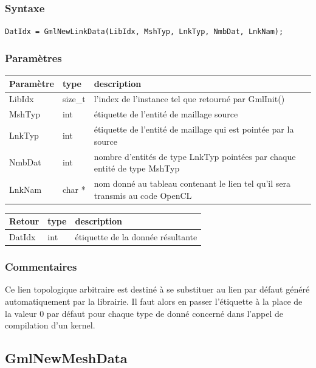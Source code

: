 \documentclass[a4paper,12pt]{article}
\begin{document}
\subsubsection*{Syntaxe}

{\tt DatIdx = GmlNewLinkData(LibIdx, MshTyp, LnkTyp, NmbDat, LnkNam);}

\subsubsection*{Paramètres}

\begin{tabular}{|m{2cm}|m{1.5cm}|m{10.5cm}|}
\hline
Paramètre  & type    & description \\
\hline
LibIdx     & size\_t & l'index de l'instance tel que retourné par GmlInit() \\
\hline
MshTyp     & int     & étiquette de l'entité de maillage source \\
\hline
LnkTyp     & int     & étiquette de l'entité de maillage qui est pointée par la source \\
\hline
NmbDat     & int     & nombre d'entités de type LnkTyp pointées par chaque entité de type MshTyp \\
\hline
LnkNam     & char *  & nom donné au tableau contenant le lien tel qu'il sera transmis au code OpenCL  \\
\hline
\end{tabular}

\medskip

\begin{tabular}{|m{2cm}|m{1.5cm}|m{10.5cm}|}
\hline
Retour     & type   & description \\
\hline
DatIdx     & int    & étiquette de la donnée résultante \\
\hline
\end{tabular}

\subsubsection*{Commentaires}
Ce lien topologique arbitraire est destiné à se substituer au lien par défaut généré automatiquement par la librairie.
Il faut alors en passer l'étiquette à la place de la valeur 0 par défaut pour chaque type de donné concerné dans l'appel de compilation d'un kernel.


\subsection{GmlNewMeshData}
\end{document}
